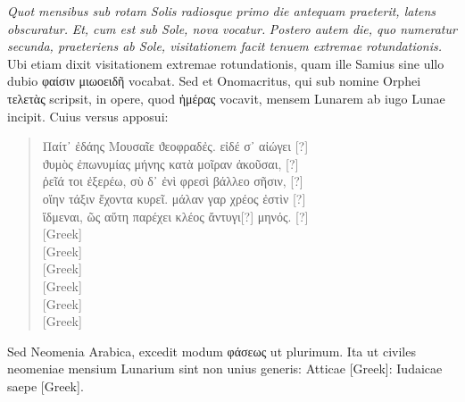 \textit{Quot mensibus sub rotam Solis radiosque primo die
antequam praeterit, latens obscuratur.}
 \textit{Et, cum est sub Sole, nova vocatur.}
\textit{Postero autem die, quo numeratur secunda,
 praeteriens ab Sole, visitationem
facit tenuem extremae rotundationis.}
Ubi etiam dixit visitationem
extremae rotundationis, quam ille Samius sine ullo dubio
 \textgreek{φαίσιν μιωοειδῆ} vocabat.
Sed et Onomacritus, qui sub nomine Orphei
 \textgreek{τελετὰς}
scripsit, in opere, quod
 \textgreek{ἡμέρας}
 vocavit, mensem Lunarem ab iugo Lunae
incipit.
Cuius versus apposui:
\begin{verse}
\begin{greek}
Παίτ᾽ ἐδάης Μουσαῖε ϑεοφραδἐς. εἰδέ σ᾽ αἰώγει [?]\\
ϑυμὸς ἐπωνυμίας μήνης κατὰ μοῖραν ἀκοῦσαι, [?]\\
ῤεῖά τοι ἐξερέω, σὺ δ᾽ ἐνὶ φρεσὶ βάλλεο σῆσιν, [?]\\
οἵην τάξιν ἔχοντα κυρεῖ. μάλαν γαρ χρέος ἐστὶν [?]\\
ἴδμεναι, ῶς αὕτη παρέχει κλέος ἄντυγι[?] μηνός. [?]\\
\textgreek{[Greek]}\\
\textgreek{[Greek]}\\
\textgreek{[Greek]}\\
\textgreek{[Greek]}\\
\textgreek{[Greek]}\\
\textgreek{[Greek]}
\end{greek}
\end{verse}
Sed Neomenia Arabica, excedit modum
 \textgreek{φάσεως} ut plurimum.
Ita ut
civiles neomeniae mensium Lunarium sint non unius generis: Atticae
\textgreek{[Greek]}: Iudaicae saepe \textgreek{[Greek]}.
